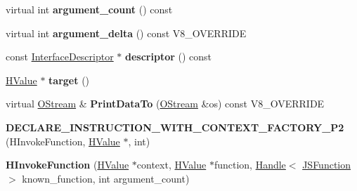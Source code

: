 \begin{DoxyCompactItemize}
\item 
\hypertarget{classv8_1_1internal_1_1_v8___f_i_n_a_l_a32bea957ef30c13b4e249646e821d607}{}virtual int {\bfseries argument\+\_\+count} () const \label{classv8_1_1internal_1_1_v8___f_i_n_a_l_a32bea957ef30c13b4e249646e821d607}

\item 
\hypertarget{classv8_1_1internal_1_1_v8___f_i_n_a_l_a819f9fee628b487f878651a2f5b42a22}{}virtual int {\bfseries argument\+\_\+delta} () const V8\+\_\+\+O\+V\+E\+R\+R\+I\+D\+E\label{classv8_1_1internal_1_1_v8___f_i_n_a_l_a819f9fee628b487f878651a2f5b42a22}

\item 
\hypertarget{classv8_1_1internal_1_1_v8___f_i_n_a_l_a0d8ccf50203d0e67a6612d4a8c9d43ba}{}const \hyperlink{classv8_1_1internal_1_1_interface_descriptor}{Interface\+Descriptor} $\ast$ {\bfseries descriptor} () const \label{classv8_1_1internal_1_1_v8___f_i_n_a_l_a0d8ccf50203d0e67a6612d4a8c9d43ba}

\item 
\hypertarget{classv8_1_1internal_1_1_v8___f_i_n_a_l_ad5346c4c3bdc0d7c40e50a1967ab1a2b}{}\hyperlink{classv8_1_1internal_1_1_h_value}{H\+Value} $\ast$ {\bfseries target} ()\label{classv8_1_1internal_1_1_v8___f_i_n_a_l_ad5346c4c3bdc0d7c40e50a1967ab1a2b}

\item 
\hypertarget{classv8_1_1internal_1_1_v8___f_i_n_a_l_ac450dad970b14246be761ccf5004924b}{}virtual \hyperlink{classv8_1_1internal_1_1_o_stream}{O\+Stream} \& {\bfseries Print\+Data\+To} (\hyperlink{classv8_1_1internal_1_1_o_stream}{O\+Stream} \&os) const V8\+\_\+\+O\+V\+E\+R\+R\+I\+D\+E\label{classv8_1_1internal_1_1_v8___f_i_n_a_l_ac450dad970b14246be761ccf5004924b}

\item 
\hypertarget{classv8_1_1internal_1_1_v8___f_i_n_a_l_a385871af46425ca781da2dfa0759e22e}{}{\bfseries D\+E\+C\+L\+A\+R\+E\+\_\+\+I\+N\+S\+T\+R\+U\+C\+T\+I\+O\+N\+\_\+\+W\+I\+T\+H\+\_\+\+C\+O\+N\+T\+E\+X\+T\+\_\+\+F\+A\+C\+T\+O\+R\+Y\+\_\+\+P2} (H\+Invoke\+Function, \hyperlink{classv8_1_1internal_1_1_h_value}{H\+Value} $\ast$, int)\label{classv8_1_1internal_1_1_v8___f_i_n_a_l_a385871af46425ca781da2dfa0759e22e}

\item 
\hypertarget{classv8_1_1internal_1_1_v8___f_i_n_a_l_a0258c1ac1fcf0ed733431c30ccdcde38}{}{\bfseries H\+Invoke\+Function} (\hyperlink{classv8_1_1internal_1_1_h_value}{H\+Value} $\ast$context, \hyperlink{classv8_1_1internal_1_1_h_value}{H\+Value} $\ast$function, \hyperlink{classv8_1_1internal_1_1_handle}{Handle}$<$ \hyperlink{classv8_1_1internal_1_1_j_s_function}{J\+S\+Function} $>$ known\+\_\+function, int argument\+\_\+count)\label{classv8_1_1internal_1_1_v8___f_i_n_a_l_a0258c1ac1fcf0ed733431c30ccdcde38}


\end{DoxyCompactItemize}
